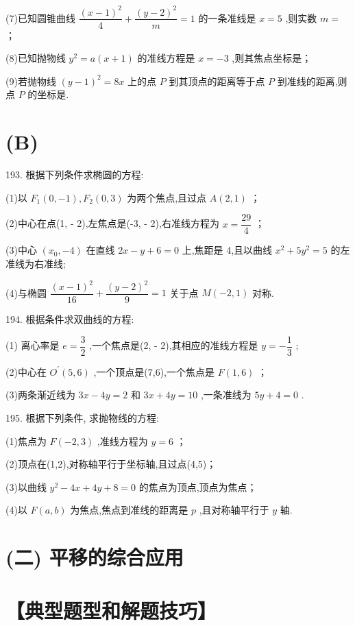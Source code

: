 (7)已知圆锥曲线 $\dfrac{{\left( x - 1\right) }^{2}}{4} + \dfrac{{\left( y - 2\right) }^{2}}{m} = 1$ 的一条准线是 $x = 5$ ,则实数 $m =$ \blkda{}；

(8)已知抛物线 ${y}^{2} = a\left( {x + 1}\right)$ 的准线方程是 $x =  - 3$ ,则其焦点坐标是\blkda{}；

(9)若抛物线 ${\left( y - 1\right) }^{2} = {8x}$ 上的点 $P$ 到其顶点的距离等于点 $P$ 到准线的距离,则点 $P$ 的坐标是\blkda{}.

\section*{(B)}

193. 根据下列条件求椭圆的方程:

(1)以 ${F}_{1}\left( {0, - 1}\right) ,{F}_{2}\left( {0,3}\right)$ 为两个焦点,且过点 $A\left( {2,1}\right)$ ；

(2)中心在点(1, - 2),左焦点是(-3, - 2),右准线方程为 $x = \dfrac{29}{4}$ ；

(3)中心 $\left( {{x}_{0}, - 4}\right)$ 在直线 ${2x} - y + 6 = 0$ 上,焦距是 4,且以曲线 ${x}^{2} + 5{y}^{2} = 5$ 的左准线为右准线;

(4)与椭圆 $\dfrac{{\left( x - 1\right) }^{2}}{16} + \dfrac{{\left( y - 2\right) }^{2}}{9} = 1$ 关于点 $M\left( {-2,1}\right)$ 对称.

194. 根据条件求双曲线的方程:

(1) 离心率是 $e = \dfrac{3}{2}$ ,一个焦点是(2, - 2),其相应的准线方程是 $y =  - \dfrac{1}{3}$ ;

(2)中心在 ${O}^{\prime }\left( {5,6}\right)$ ,一个顶点是(7,6),一个焦点是 $F\left( {1,6}\right)$ ；

(3)两条渐近线为 ${3x} - {4y} = 2$ 和 ${3x} + {4y} = {10}$ ,一条准线为 ${5y} + 4 = 0$ .

195. 根据下列条件, 求抛物线的方程:

(1)焦点为 $F\left( {-2,3}\right)$ ,准线方程为 $y = 6$ ；

(2)顶点在(1,2),对称轴平行于坐标轴,且过点(4,5)；

(3)以曲线 ${y}^{2} - {4x} + {4y} + 8 = 0$ 的焦点为顶点,顶点为焦点；

(4)以 $F\left( {a,b}\right)$ 为焦点,焦点到准线的距离是 $p$ ,且对称轴平行于 $y$ 轴.

\section*{(二) 平移的综合应用}

\section*{【典型题型和解题技巧】}

